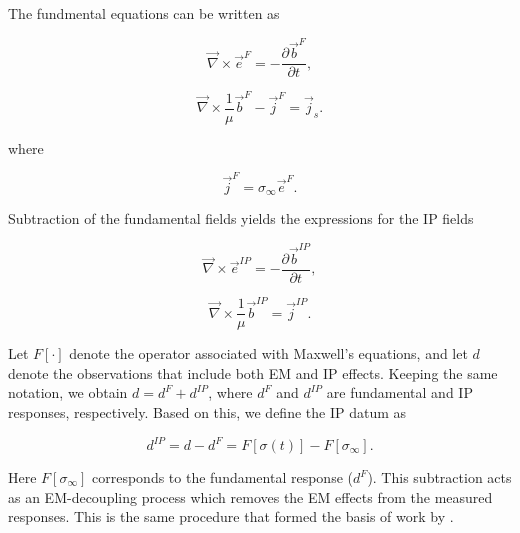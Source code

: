\documentclass[extra,mreferee]{gji}
\newcommand{\curl}{{\vec \nabla}\times}
\newcommand{\siginf}{\sigma_\infty}
\renewcommand {\j}  { {\vec j} }
\renewcommand {\b}  { {\vec b} }
\newcommand {\e}  { {\vec e} }
\newcommand{\dip}{d^{IP}}
\begin{document}
The fundmental equations can be written as
\begin{linenomath*}
\begin{equation}
  \curl \e^{F} = -\frac{\partial \b^{F}}{\partial t},
  \label{eq: eq_primary_farad}
\end{equation}
\end{linenomath*}
\begin{linenomath*}
\begin{equation}
  \curl{\frac{1}{\mu}\b^{F}} -\j^{F} = \j_s.
  \label{eq: eq_primary_coulomb}
\end{equation}
\end{linenomath*}
where
\begin{linenomath*}
\begin{equation}
  \j^{F} = \siginf\e^{F}.
  \label{eq: jF}
\end{equation}
\end{linenomath*}

Subtraction of the fundamental fields yields the expressions for the IP fields
\begin{linenomath*}
\begin{equation}
  \curl \e^{IP} = -\frac{\partial \b^{IP}}{\partial t},
  \label{eq: eq_secondary_farad}
\end{equation}
\end{linenomath*}
\begin{linenomath*}
\begin{equation}
  \curl{\frac{1}{\mu}\b^{IP}} = \j^{IP}.
  \label{eq: eq_secondary_coulomb}
\end{equation}
\end{linenomath*}

Let $F[\cdot]$ denote the operator associated with Maxwell’s equations, and let $d$ denote the observations that include both EM and IP effects.
Keeping the same notation, we obtain $d = d^{F} + \dip$, where $d^F$ and $\dip$ are fundamental and IP responses, respectively.
Based on this, we define the IP datum as
\begin{linenomath*}
\begin{equation}
  \dip = d - d^{F} = F[\sigma(t)]-F[\siginf].
    \label{eq: IPdatum_syn}
\end{equation}
\end{linenomath*}
Here $F[\siginf]$ corresponds to the fundamental response ($d^F$).
This subtraction acts as an EM-decoupling process which removes the EM effects from the measured responses. This is the same procedure that formed the basis of work by \cite{routh2001}.
\end{document}
